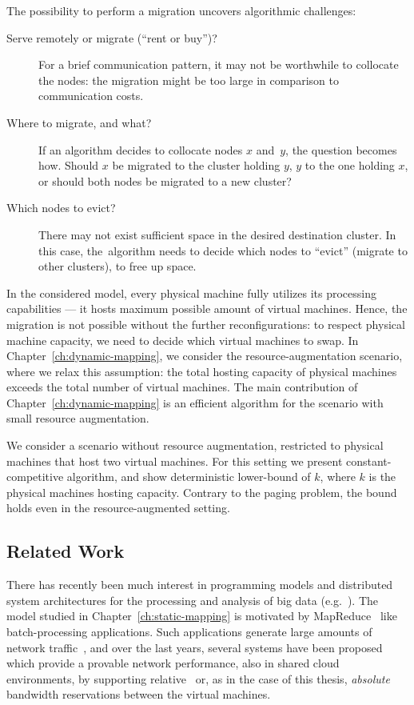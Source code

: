 The possibility to perform a migration uncovers algorithmic challenges:
\begin{description}

\item[Serve remotely or migrate (``rent or buy'')?] For a brief communication
pattern, it may not be worthwhile to collocate the nodes: the migration might
be too large in comparison to communication costs.

\item[Where to migrate, and what?]
If an algorithm decides to collocate nodes $x$ and~$y$, the question becomes
how. Should $x$ be migrated to the cluster holding $y$, $y$ to the one holding
$x$, or should both nodes be migrated to a new cluster?

\item[Which nodes to evict?]
There may not exist sufficient space in the desired destination cluster. In
this case, the~algorithm needs to decide which nodes to ``evict'' (migrate to
other clusters), to free up space.

\end{description}

In the considered model, every physical machine fully utilizes its processing capabilities --- it hosts maximum possible amount of virtual machines.
Hence, the migration is not possible without the further reconfigurations: to respect physical machine capacity, we need to decide which virtual machines to swap.
In Chapter~\ref{ch:dynamic-mapping}, we consider the resource-augmentation scenario, where we relax this assumption: the total hosting capacity of physical machines exceeds the total number of virtual machines.
The main contribution of Chapter~\ref{ch:dynamic-mapping} is an efficient algorithm for the scenario with small resource augmentation.

We consider a scenario without resource augmentation, restricted to physical machines that host two virtual machines.
For this setting we present constant-competitive algorithm, and show deterministic lower-bound of $k$, where $k$ is the physical machines hosting capacity.
Contrary to the paging problem, the bound holds even in the resource-augmented setting.

\subsection{Related Work}


There has recently been much interest in programming models and distributed
system architectures for the processing and analysis of big data (e.g.~\cite{nodb,mapreduce,shark}). The model studied in
Chapter~\ref{ch:static-mapping} is motivated by MapReduce~\cite{mapreduce} like batch-processing applications.
Such applications
generate large amounts of network traffic~\cite{orchestra,talk-about,amazonbw},
and over the last years, several systems have been proposed which provide
a provable network performance, also in shared cloud environments, by supporting
relative~\cite{faircloud,elasticswitch,seawall}
or, as in the case of this thesis, \emph{absolute}~\cite{oktopus,secondnet,drl,gatekeeper,proteus} bandwidth reservations
between the virtual machines.

